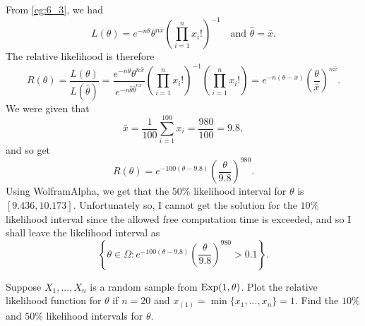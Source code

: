 \documentclass[notoc,notitlepage]{tufte-book}
\begin{document}
\begin{solution}
  From \cref{eg:6_3}, we had
  \begin{equation*}
    L(\theta) = e^{-n \theta} \theta^{n \bar{x}} \left( \prod_{i=1}^{n} x_i! \right)^{-1} \quad \text{and } \hat{\theta} = \bar{x}.
  \end{equation*}
  The relative likelihood is therefore
  \begin{equation*}
    R(\theta) = \frac{L(\theta)}{L(\hat{\theta})} = \frac{e^{-n \theta} \theta^{n \bar{x}}}{e^{-n \hat{\theta} \hat{\theta}^{n \bar{x}}}} \left( \prod_{i=1}^{n} x_i! \right)^{-1} \left( \prod_{i=1}^{n} x_i! \right) = e^{-n ( \theta - \bar{x} )} \left( \frac{\theta}{\bar{x}} \right)^{n \bar{x}}.
  \end{equation*}
  We were given that
  \begin{equation*}
    \bar{x} = \frac{1}{100} \sum_{i=1}^{100} x_i = \frac{980}{100} = 9.8,
  \end{equation*}
  and so get
  \begin{equation*}
    R(\theta) = e^{- 100 ( \theta - 9.8 )} \left( \frac{\theta}{9.8} \right)^{980}.
  \end{equation*}
  Using WolframAlpha, we get that the $50\%$ likelihood interval for $\theta$ is $[9.436, 10.173]$. Unfortunately so, I cannot get the solution for the $10\%$ likelihood interval since the allowed free computation time is exceeded, and so I shall leave the likelihood interval as
  \begin{equation*}
    \left\{ \theta \in \Omega : e^{-100(\theta - 9.8)}\left( \frac{\theta}{9.8} \right)^{980} > 0.1 \right\}.
  \end{equation*}
\end{solution}

\begin{eg}\label{eg:6_11}
  Suppose $X_1, ..., X_n$ is a random sample from $\operatorname{Exp}(1, \theta)$. Plot the relative likelihood function for $\theta$ if $n = 20$ and $x_{(1)} = \min\{x_1, ..., x_n\} = 1$. Find the $10\%$ and $50\%$ likelihood intervals for $\theta$.
\end{eg}
\end{document}
